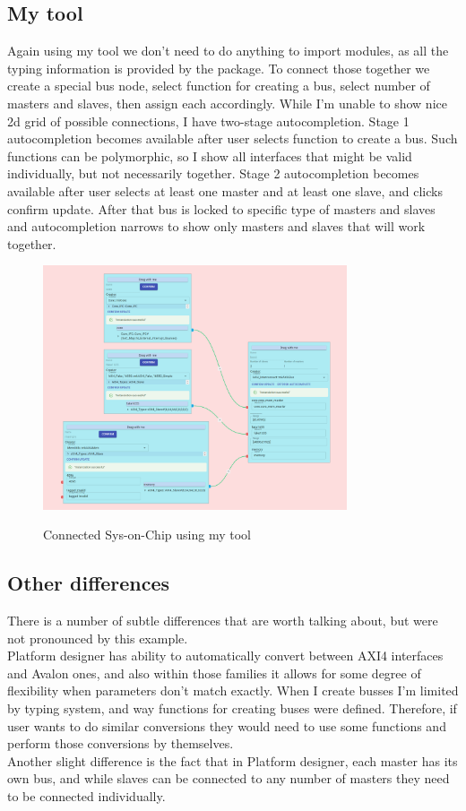 \documentclass[12pt]{report}
\begin{document}
\subsection{My tool}
Again using my tool we don't need to do anything to import modules, as all the typing information is provided by the package. To connect those together we create a special bus node, select function for creating a bus, select number of masters and slaves, then assign each accordingly. While I'm unable to show nice 2d grid of possible connections, I have two-stage autocompletion. Stage 1 autocompletion becomes available after user selects function to create a bus. Such functions can be polymorphic, so I show all interfaces that might be valid individually, but not necessarily together. Stage 2 autocompletion becomes available after user selects at least one master and at least one slave, and clicks confirm update. After that bus is locked to specific type of masters and slaves and autocompletion narrows to show only masters and slaves that will work together.
\begin{figure}
    \caption{Connected Sys-on-Chip using my tool}
    \includegraphics[width=0.8\textwidth]{images/Example2MySolution.png} \\
    \centering
\end{figure}

\subsection{Other differences}
There is a number of subtle differences that are worth talking about, but were not pronounced by this example.
\\
Platform designer has ability to automatically convert between AXI4 interfaces and Avalon ones, and also within those families it allows for some degree of flexibility when parameters don't match exactly.
When I create busses I'm limited by typing system, and way functions for creating buses were defined. Therefore, if user wants to do similar conversions they would need to use some functions and perform those conversions by themselves.
\\
Another slight difference is the fact that in Platform designer, each master has its own bus, and while slaves can be connected to any number of masters they need to be connected individually. 
\end{document}
